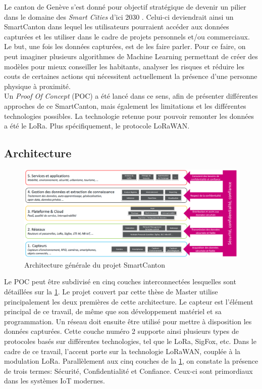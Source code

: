 Le canton de Genève s'est donné pour objectif stratégique de devenir un pilier dans le domaine des \textit{Smart Cities} d'ici 2030 \cite{Genevebr38:online}. Celui-ci deviendrait ainsi un SmartCanton dans lequel les utilisateurs pourraient accéder aux données capturées et les utiliser dans le cadre de projets personnels et/ou commerciaux. Le but, une fois les données capturées, est de les faire parler. Pour ce faire, on peut imaginer plusieurs algorithmes de Machine Learning permettant de créer des modèles pour mieux conseiller les habitants, analyser les risques et réduire les couts de certaines actions qui nécessitent actuellement la présence d'une personne physique à proximité. \\

Un \textit{Proof Of Concept} (POC) a été lancé dans ce sens, afin de présenter différentes approches de ce SmartCanton, mais également les limitations et les différentes technologies possibles. La technologie retenue pour pouvoir remonter les données a été le LoRa. Plus spécifiquement, le protocole LoRaWAN.



\subsection{Architecture}

\begin{figure}[ht!]
    \centering
    \includegraphics[width=1.0\textwidth]{Figures/StateOfTheArt/SmartCanton/architecture_smartcanton.png}
    \caption{Architecture générale du projet SmartCanton}
    \label{fig-architecture_smartcanton}
\end{figure}

Le POC peut être subdivisé en cinq couches interconnectées lesquelles sont détaillées sur la \cref{fig-architecture_smartcanton}. Le projet couvert par cette thèse de Master utilise principalement les deux premières de cette architecture. Le capteur est l'élément principal de ce travail, de même que son développement matériel et sa programmation. Un réseau doit ensuite être utilisé pour mettre à disposition les données capturées. Cette couche numéro 2 supporte ainsi plusieurs types de protocoles basés sur différentes technologies, tel que le LoRa, SigFox, etc. Dans le cadre de ce travail, l'accent porte sur la technologie LoRaWAN, couplée à la modulation LoRa. Parallèlement aux cinq couches de la \cref{fig-architecture_smartcanton}, on constate la présence de trois termes: Sécurité, Confidentialité et Confiance. Ceux-ci sont primordiaux dans les systèmes IoT modernes.

